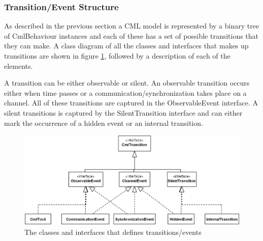 \documentclass[a4paper, 12pt]{include/compassreport}   %
\begin{document}
\subsubsection{Transition/Event Structure}
\label{sec:event_structure}

As described in the previous section a CML model is represented by a
binary tree of CmlBehaviour instances and each of these has a set of
possible transitions that they can make. A class diagram of all the
classes and interfaces that makes up transitions are shown in figure
\ref{fig:events}, followed by a description of each of the elements.

A transition can be either observable or silent. An observable
transition occurs either when time passes or a
communication/synchronization takes place on a channel. All of these
transitions are captured in the ObservableEvent interface. 
A silent transitions is captured by the SilentTransition interface and
can either mark the occurrence of a hidden event or an internal
transition.

\begin{figure}[ht!]
  \begin{center}
    \includegraphics[width=1\textwidth]{figures/Events}
    \caption{The classes and interfaces that defines transitions/events}
    \label{fig:events}
  \end{center}
\end{figure}
\end{document}
